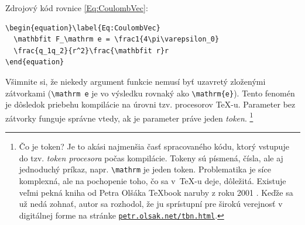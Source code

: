 \documentclass[../../../thesis.tex]{subfiles}
\begin{document}
Zdrojový kód rovnice \eqref{Eq:CoulombVec}:
\begin{verbatim}
\begin{equation}\label{Eq:CoulombVec}
  \mathbfit F_\mathrm e = \frac1{4\pi\varepsilon_0}
  \frac{q_1q_2}{r^2}\frac{\mathbfit r}r
\end{equation}
\end{verbatim}
Všimnite si, že niekedy argument funkcie nemusí byť
uzavretý zloženými zátvorkami (\verb|\mathrm e| je vo výsledku rovnaký ako \verb|\mathrm{e}|).
Tento fenomén je dôsledok priebehu kompilácie na úrovni tzv. procesorov \TeX-u.
Parameter bez zátvorky funguje správne vtedy,
ak je parameter práve jeden \emph{token}.%
\footnote{Čo je token? Je to akási najmenšia časť spracovaného
kódu, ktorý vstupuje do tzv. \emph{token procesora}
počas kompilácie.
Tokeny sú písmená, čísla, ale aj jednoduchý príkaz,
napr. \texttt{\textbackslash mathrm} je jeden token.
Problematika je síce komplexná, ale na pochopenie
toho, čo sa v~\TeX-u deje, dôležitá.
Existuje veľmi pekná kniha od Petra Olšáka \TeX book naruby z roku 2001 \cite{Olsak2001Texbook}.
Keďže sa už nedá zohnať, autor sa rozhodol, že ju sprístupní pre širokú verejnosť v digitálnej forme na stránke
\href{https://petr.olsak.net/tbn.html}{\texttt{petr.olsak.net/tbn.html}}.
}
\end{document}
